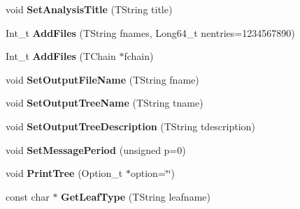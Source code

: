\begin{DoxyCompactItemize}
\item 
\hypertarget{class_h_a_l_1_1_analysis_ab4ecf4f7c5c29027ac3eb3e3a2e3a780}{void {\bfseries Set\+Analysis\+Title} (T\+String title)}\label{class_h_a_l_1_1_analysis_ab4ecf4f7c5c29027ac3eb3e3a2e3a780}

\item 
\hypertarget{class_h_a_l_1_1_analysis_a540cf522be42290e16d6ac0c7dbff0ba}{Int\+\_\+t {\bfseries Add\+Files} (T\+String fnames, Long64\+\_\+t nentries=1234567890)}\label{class_h_a_l_1_1_analysis_a540cf522be42290e16d6ac0c7dbff0ba}

\item 
\hypertarget{class_h_a_l_1_1_analysis_af8fccc1f3c27d6402ecad559648b7ff0}{Int\+\_\+t {\bfseries Add\+Files} (T\+Chain $\ast$fchain)}\label{class_h_a_l_1_1_analysis_af8fccc1f3c27d6402ecad559648b7ff0}

\item 
\hypertarget{class_h_a_l_1_1_analysis_a9e6b12787599c0c36f576350e2e93b8d}{void {\bfseries Set\+Output\+File\+Name} (T\+String fname)}\label{class_h_a_l_1_1_analysis_a9e6b12787599c0c36f576350e2e93b8d}

\item 
\hypertarget{class_h_a_l_1_1_analysis_a50f84d17528b7ba7621c65696dd81e75}{void {\bfseries Set\+Output\+Tree\+Name} (T\+String tname)}\label{class_h_a_l_1_1_analysis_a50f84d17528b7ba7621c65696dd81e75}

\item 
\hypertarget{class_h_a_l_1_1_analysis_a6461758cc06f7a334a487d857172983a}{void {\bfseries Set\+Output\+Tree\+Description} (T\+String tdescription)}\label{class_h_a_l_1_1_analysis_a6461758cc06f7a334a487d857172983a}

\item 
\hypertarget{class_h_a_l_1_1_analysis_a4561423621e94e5593694df20f7b9c60}{void {\bfseries Set\+Message\+Period} (unsigned p=0)}\label{class_h_a_l_1_1_analysis_a4561423621e94e5593694df20f7b9c60}

\item 
\hypertarget{class_h_a_l_1_1_analysis_afccfbae795035cfe75578fa805aefa93}{void {\bfseries Print\+Tree} (Option\+\_\+t $\ast$option=\char`\"{}\char`\"{})}\label{class_h_a_l_1_1_analysis_afccfbae795035cfe75578fa805aefa93}

\item 
\hypertarget{class_h_a_l_1_1_analysis_a7c6603a4cc7b74591f5c0427f59023d5}{const char $\ast$ {\bfseries Get\+Leaf\+Type} (T\+String leafname)}\label{class_h_a_l_1_1_analysis_a7c6603a4cc7b74591f5c0427f59023d5}


\end{DoxyCompactItemize}
